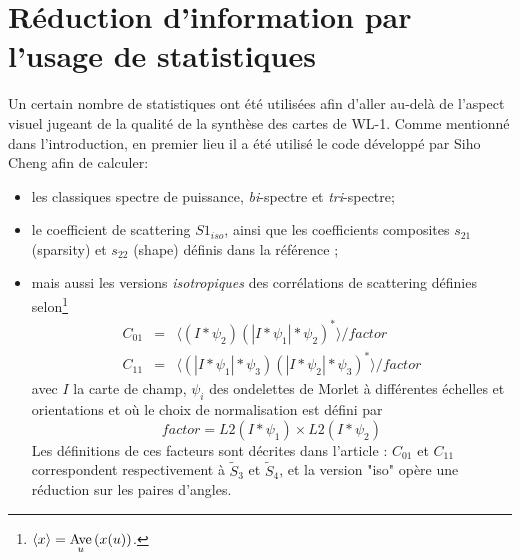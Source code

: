 \documentclass[12pt,twoside]{article}
\newcommand{\Av}[1] {\underset {#1} {\rm Ave}\,}
\newcommand{\itemb}{\item[$\bullet$]}
\begin{document}
\section{Réduction d'information par l'usage de statistiques}
\label{sec-summary-stat}
%
Un certain nombre de statistiques ont été utilisées afin d'aller au-delà de l'aspect visuel jugeant de la qualité de la synthèse des cartes de WL-1. Comme mentionné dans l'introduction, en premier lieu il a été utilisé le code développé par Siho Cheng afin de calculer:
\begin{itemize}
\itemb les classiques spectre de puissance, \textit{bi}-spectre et \textit{tri}-spectre; 
\itemb le coefficient de scattering $S1_{iso}$, ainsi que les coefficients composites $s_{21}$ (sparsity) et $s_{22}$ (shape) définis dans la référence \citep{2021arXiv211201288C}; 
\itemb mais aussi les versions \textit{isotropiques} des corrélations de scattering définies selon\footnote{$\langle x \rangle =\Av{u}(x(u))$.}
\begin{eqnarray}
 C_{01} &=& \langle(I \ast \psi_2)(|I \ast \psi_1| \ast \psi_2)^\ast\rangle / factor \\
 C_{11} &=& \langle(|I \ast \psi_1| * \psi_3)(|I * \psi_2| * \psi_3)^\ast\rangle / factor
\end{eqnarray}
avec $I$ la carte de champ, $\psi_i$ des ondelettes de Morlet à différentes échelles et orientations et où le choix de normalisation est défini par
\begin{equation}
factor = L2(I \ast \psi_1) \times L2(I \ast \psi_2)
\end{equation}
Les définitions de ces facteurs sont décrites dans l'article \citep{2023arXiv230617210C}: $C_{01}$ et $C_{11}$ correspondent respectivement à $\tilde{S}_3$ et $\tilde{S}_4$, et la version "iso" opère une réduction sur les paires d'angles. 
\end{itemize}
\end{document}
